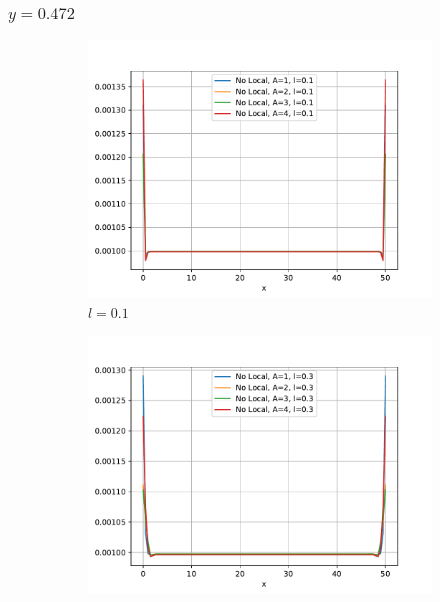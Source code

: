 	\subsubsection{\texorpdfstring{$y=0.472$}{y=0.472}}

		\begin{figure}
		    \centering
		    \sffamily
		    \begin{subfigure}{0.48\textwidth}
		    \centering
		        \includegraphics[width=\textwidth]{figuras/Barra/Perfiles/Y/Y0.1_0.472.pdf}
		        \caption{$l=0.1$}
		        \label{fig:perfilesbarraY0472.01}
		    \end{subfigure}
		    \begin{subfigure}{0.48\textwidth}
		    \centering
		        \includegraphics[width=\textwidth]{figuras/Barra/Perfiles/Y/Y0.3_0.472.pdf}

\end{subfigure}
\end{figure}
